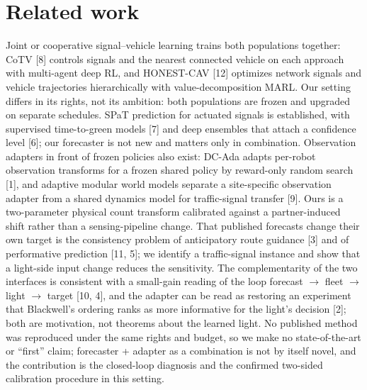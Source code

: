 \documentclass[11pt]{article}
\begin{document}
\section{Related work}
Joint or cooperative signal--vehicle learning trains both populations together: CoTV [8] controls signals and the nearest connected
vehicle on each approach with multi-agent deep RL, and HONEST-CAV [12] optimizes network signals and vehicle trajectories hierarchically
with value-decomposition MARL. Our setting differs in its rights, not its ambition: both populations are frozen and upgraded on
separate schedules. SPaT prediction for actuated signals is established, with supervised time-to-green models [7] and deep ensembles that
attach a confidence level [6]; our forecaster is not new and matters only in combination. Observation adapters in front of frozen
policies also exist: DC-Ada adapts per-robot observation transforms for a frozen shared policy by reward-only random search [1], and
adaptive modular world models separate a site-specific observation adapter from a shared dynamics model for traffic-signal transfer [9].
Ours is a two-parameter physical count transform calibrated against a partner-induced shift rather than a sensing-pipeline change. That
published forecasts change their own target is the consistency problem of anticipatory route guidance [3] and of performative prediction
[11, 5]; we identify a traffic-signal instance and show that a light-side input change reduces the sensitivity. The complementarity of
the two interfaces is consistent with a small-gain reading of the loop forecast $\to$ fleet $\to$ light $\to$ target [10, 4], and the
adapter can be read as restoring an experiment that Blackwell's ordering ranks as more informative for the light's decision [2]; both are
motivation, not theorems about the learned light. No published method was reproduced under the same rights and budget, so we make no
state-of-the-art or ``first'' claim; forecaster + adapter as a combination is not by itself novel, and the contribution is the
closed-loop diagnosis and the confirmed two-sided calibration procedure in this setting.
\end{document}
